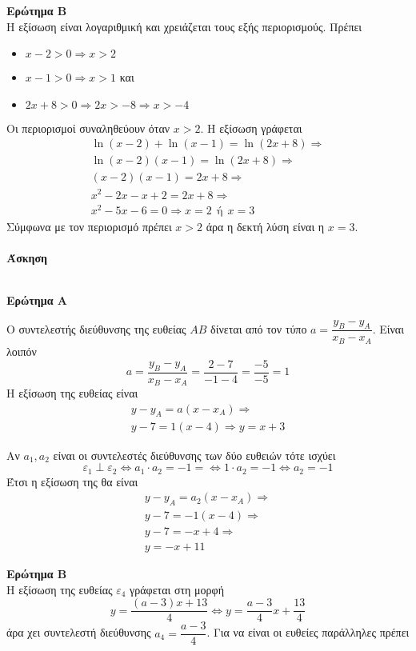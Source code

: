 \documentclass[11pt,a4paper]{article}
\newcommand{\kerkissans}[1]{{\fontfamily{maksf}\selectfont \textbf{#1}}}
\newcounter{askhsh}
\newcommand{\askhsh}{\kerkissans{\large Άσκηση \theaskhsh}\ \addtocounter{askhsh}{1}}
\begin{document}
\textbf{Ερώτημα Β}\\
Η εξίσωση είναι λογαριθμική και χρειάζεται τους εξής περιορισμούς. Πρέπει
\begin{itemize}
\item $x-2>0\Rightarrow x>2$
\item $x-1>0\Rightarrow x>1$ και 
\item $2x+8>0\Rightarrow 2x>-8\Rightarrow x>-4$
\end{itemize}
Οι περιορισμοί συναληθεύουν όταν $x>2$. Η εξίσωση γράφεται
\begin{gather*}
\ln{(x-2)}+\ln{(x-1)}=\ln{(2x+8)}\Rightarrow\\
\ln{(x-2)(x-1)}=\ln{(2x+8)}\Rightarrow\\
(x-2)(x-1)=2x+8\Rightarrow\\
x^2-2x-x+2=2x+8\Rightarrow\\
x^2-5x-6=0\Rightarrow x=2\ \ \text{ή}\ \ x=3
\end{gather*}
Σύμφωνα με τον περιορισμό πρέπει $x>2$ άρα η δεκτή λύση είναι η $x=3$.\\\\
\askhsh\\
\textbf{Ερώτημα Α}
\begin{rlist}
\item Ο συντελεστής διεύθυνσης της ευθείας $AB$ δίνεται από τον τύπο $a=\dfrac{y_B-y_A}{x_B-x_A}$. Είναι λοιπόν
\[ a=\dfrac{y_B-y_A}{x_B-x_A}=\dfrac{2-7}{-1-4}=\frac{-5}{-5}=1 \]
Η εξίσωση της ευθείας είναι
\begin{gather*}
y-y_A=a(x-x_A)\Rightarrow\\
y-7=1(x-4)\Rightarrow y=x+3
\end{gather*}
\item Αν $a_1,a_2$ είναι οι συντελεστές διεύθυνσης των δύο ευθειών τότε ισχύει
\[ \varepsilon_1\perp\varepsilon_2\Leftrightarrow a_1\cdot a_2=-1=\Leftrightarrow 1\cdot a_2=-1\Leftrightarrow a_2=-1 \]
Έτσι η εξίσωση της θα είναι
\begin{gather*}
y-y_A=a_2(x-x_A)\Rightarrow\\
y-7=-1(x-4)\Rightarrow\\
y-7=-x+4\Rightarrow\\
y=-x+11
\end{gather*}
\end{rlist}
\textbf{Ερώτημα Β}\\
Η εξίσωση της ευθείας $\varepsilon_4$ γράφεται στη μορφή
\[y=\frac{(a-3)x+13}{4}\Leftrightarrow y=\frac{a-3}{4}x+\frac{13}{4}\]
άρα χει συντελεστή διεύθυνσης $a_{4}=\dfrac{a-3}{4}$. Για να είναι οι ευθείες παράλληλες πρέπει
\end{document}

